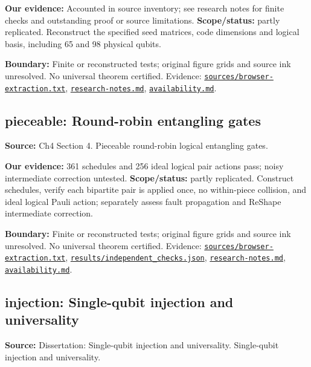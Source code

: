 \documentclass[11pt]{article}
\begin{document}
\textbf{Our evidence:} Accounted in source inventory; see research notes for finite checks and outstanding proof or source limitations. \textbf{Scope/status:} partly replicated. Reconstruct the specified seed matrices, code dimensions and logical basis, including 65 and 98 physical qubits.

\textbf{Boundary:} Finite or reconstructed tests; original figure grids and source ink unresolved. No universal theorem certified. Evidence: \href{https://github.com/alectionary/vibe-math/blob/master/formalization/quintavalle-hgp/sources/browser-extraction.txt}{\nolinkurl{sources/browser-extraction.txt}}, \href{https://github.com/alectionary/vibe-math/blob/master/formalization/quintavalle-hgp/research-notes.md}{\nolinkurl{research-notes.md}}, \href{https://github.com/alectionary/vibe-math/blob/master/formalization/quintavalle-hgp/availability.md}{\nolinkurl{availability.md}}.
\subsection{pieceable: Round-robin entangling gates}
\label{claim:pieceable}
\textbf{Source:} Ch4 Section 4. Pieceable round-robin logical entangling gates.

\textbf{Our evidence:} 361 schedules and 256 ideal logical pair actions pass; noisy intermediate correction untested. \textbf{Scope/status:} partly replicated. Construct schedules, verify each bipartite pair is applied once, no within-piece collision, and ideal logical Pauli action; separately assess fault propagation and ReShape intermediate correction.

\textbf{Boundary:} Finite or reconstructed tests; original figure grids and source ink unresolved. No universal theorem certified. Evidence: \href{https://github.com/alectionary/vibe-math/blob/master/formalization/quintavalle-hgp/sources/browser-extraction.txt}{\nolinkurl{sources/browser-extraction.txt}}, \href{https://github.com/alectionary/vibe-math/blob/master/formalization/quintavalle-hgp/results/independent_checks.json}{\nolinkurl{results/independent_checks.json}}, \href{https://github.com/alectionary/vibe-math/blob/master/formalization/quintavalle-hgp/research-notes.md}{\nolinkurl{research-notes.md}}, \href{https://github.com/alectionary/vibe-math/blob/master/formalization/quintavalle-hgp/availability.md}{\nolinkurl{availability.md}}.
\subsection{injection: Single-qubit injection and universality}
\label{claim:injection}
\textbf{Source:} Dissertation: Single-qubit injection and universality. Single-qubit injection and universality.
\end{document}
